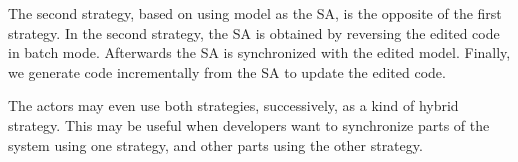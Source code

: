 The second strategy, based on using model as the SA,
is the opposite of the first strategy. 
In the second strategy, the SA is
obtained by reversing the edited code in batch mode.
Afterwards the SA is synchronized with the edited model.
Finally, we generate code incrementally from the SA to update the edited code.

%
%

The actors may even use both strategies, successively, as a kind of hybrid strategy.
This may be useful
when developers want to synchronize parts of the system using one strategy,
and other parts using the other strategy. %

